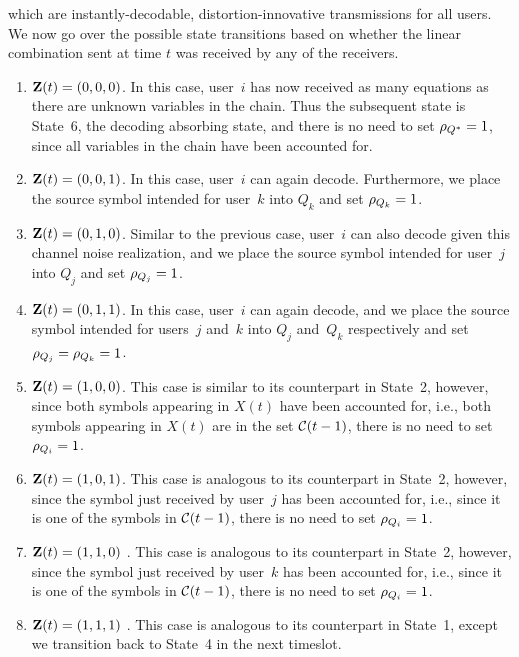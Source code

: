 \begin{LaTeXdescription}
\begin{subequations}
	\end{subequations}
	which are instantly-decodable, distortion-innovative transmissions for all users.
	We now go over the possible state transitions based on whether the linear combination sent at time $t$ was received by any of the receivers.
	\begin{enumerate}
		\item $\mathbf{Z}(t) = (0, 0, 0)$.  In this case, user~$i$ has now received as many equations as there are unknown variables in the chain.  Thus the subsequent state is State~6, the decoding absorbing state, and there is no need to set $\rho_{Q^{*}} = 1$, since all variables in the chain have been accounted for.  
		\item $\mathbf{Z}(t) = (0, 0, 1)$. In this case, user~$i$ can again decode. Furthermore, we place the source symbol intended for user~$k$ into $Q_k$ and set $\rho_{Q_{k}} = 1$.
		\item $\mathbf{Z}(t) = (0, 1, 0)$. Similar to the previous case, user~$i$ can also decode given this channel noise realization, and we place the source symbol intended for user~$j$ into $Q_j$ and set $\rho_{Q_{j}} = 1$.
		\item $\mathbf{Z}(t) = (0, 1, 1)$. In this case, user~$i$ can again decode, and we place the source symbol intended for users~$j$ and~$k$ into $Q_j$ and~$Q_k$ respectively and set $\rho_{Q_{j}} = \rho_{Q_{k}} = 1$.
		\item $\mathbf{Z}(t) = (1, 0, 0)$.  This case is similar to its counterpart in State~2, however, since both symbols appearing in $X(t)$ have been accounted for, i.e., both symbols appearing in $X(t)$ are in the set $\mathcal{C}(t-1)$, there is no need to set $\rho_{Q_{i}} = 1$.
		\item $\mathbf{Z}(t) = (1, 0, 1)$.  This case is analogous to its counterpart in State~2, however, since the symbol just received by user~$j$ has been accounted for, i.e., since it is one of the symbols in $\mathcal{C}(t-1)$, there is no need to set $\rho_{Q_{i}} = 1$.
		\item $\mathbf{Z}(t) = (1, 1, 0)$	.  This case is analogous to its counterpart in State~2, however, since the symbol just received by user~$k$ has been accounted for, i.e., since it is one of the symbols in $\mathcal{C}(t-1)$, there is no need to set $\rho_{Q_{i}} = 1$.
		\item $\mathbf{Z}(t) = (1, 1, 1)$	.  This case is analogous to its counterpart in State~1, except we transition back to State~4 in the next timeslot.
	\end{enumerate}
\end{LaTeXdescription}





